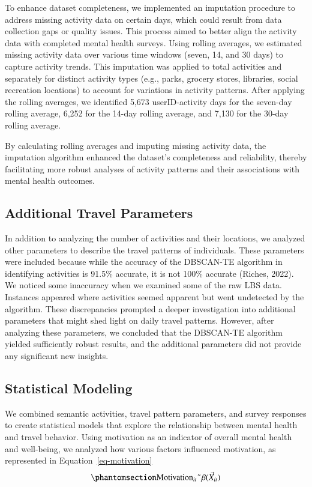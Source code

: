 \documentclass[
  letterpaper,
  number,
  review,
  3p]{elsarticle}
\begin{document}
To enhance dataset completeness, we implemented an imputation procedure
to address missing activity data on certain days, which could result
from data collection gaps or quality issues. This process aimed to
better align the activity data with completed mental health surveys.
Using rolling averages, we estimated missing activity data over various
time windows (seven, 14, and 30 days) to capture activity trends. This
imputation was applied to total activities and separately for distinct
activity types (e.g., parks, grocery stores, libraries, social
recreation locations) to account for variations in activity patterns.
After applying the rolling averages, we identified 5,673 userID-activity
days for the seven-day rolling average, 6,252 for the 14-day rolling
average, and 7,130 for the 30-day rolling average.

By calculating rolling averages and imputing missing activity data, the
imputation algorithm enhanced the dataset's completeness and
reliability, thereby facilitating more robust analyses of activity
patterns and their associations with mental health outcomes.

\subsection{Additional Travel
Parameters}\label{additional-travel-parameters}

In addition to analyzing the number of activities and their locations,
we analyzed other parameters to describe the travel patterns of
individuals. These parameters were included because while the accuracy
of the DBSCAN-TE algorithm in identifying activities is 91.5\% accurate,
it is not 100\% accurate (Riches, 2022). We noticed some inaccuracy when
we examined some of the raw LBS data. Instances appeared where
activities seemed apparent but went undetected by the algorithm. These
discrepancies prompted a deeper investigation into additional parameters
that might shed light on daily travel patterns. However, after analyzing
these parameters, we concluded that the DBSCAN-TE algorithm yielded
sufficiently robust results, and the additional parameters did not
provide any significant new insights.

\subsection{Statistical Modeling}\label{statistical-modeling}

We combined semantic activities, travel pattern parameters, and survey
responses to create statistical models that explore the relationship
between mental health and travel behavior. Using motivation as an
indicator of overall mental health and well-being, we analyzed how
various factors influenced motivation, as represented in
Equation~\ref{eq-motivation}
\begin{equation}\phantomsection\label{eq-motivation}{
\text{Motivation}_{it} \; \tilde{} \; \beta (\vec{X}_{it})
}\end{equation}
\end{document}
